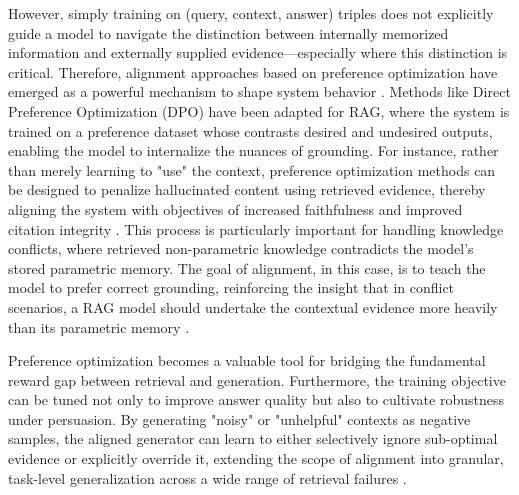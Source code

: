 \documentclass[11pt,a4paper]{article}
\begin{document}
However, simply training on (query, context, answer) triples does not explicitly guide a model to navigate the distinction between internally memorized information and externally supplied evidence---especially where this distinction is critical. Therefore, alignment approaches based on preference optimization have emerged as a powerful mechanism to shape system behavior \cite{arxiv:2411.19443v1}. Methods like Direct Preference Optimization (DPO) have been adapted for RAG, where the system is trained on a preference dataset whose contrasts desired and undesired outputs, enabling the model to internalize the nuances of grounding. For instance, rather than merely learning to "use" the context, preference optimization methods can be designed to penalize hallucinated content using retrieved evidence, thereby aligning the system with objectives of increased faithfulness and improved citation integrity \cite{arxiv:2401.06954v2}. This process is particularly important for handling knowledge conflicts, where retrieved non-parametric knowledge contradicts the model's stored parametric memory. The goal of alignment, in this case, is to teach the model to prefer correct grounding, reinforcing the insight that in conflict scenarios, a RAG model should undertake the contextual evidence more heavily than its parametric memory \cite{arxiv:2410.05162v1}.

Preference optimization becomes a valuable tool for bridging the fundamental reward gap between retrieval and generation. Furthermore, the training objective can be tuned not only to improve answer quality but also to cultivate robustness under persuasion. By generating "noisy" or "unhelpful" contexts as negative samples, the aligned generator can learn to either selectively ignore sub-optimal evidence or explicitly override it, extending the scope of alignment into granular, task-level generalization across a wide range of retrieval failures \cite{arxiv:2404.10981v1}.
\end{document}
